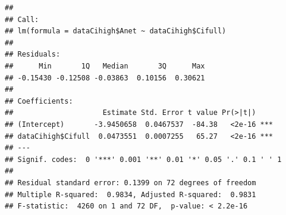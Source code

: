 \documentclass[
]{krantz}
\makeatletter
\newenvironment{Shaded}{\begin{snugshade}}{\end{snugshade}}
\newcommand{\DecValTok}[1]{\textcolor[rgb]{0.00,0.00,0.81}{#1}}
\newcommand{\FunctionTok}[1]{\textcolor[rgb]{0.00,0.00,0.00}{#1}}
\newcommand{\NormalTok}[1]{#1}
\newcommand{\OtherTok}[1]{\textcolor[rgb]{0.56,0.35,0.01}{#1}}
\newcommand{\SpecialCharTok}[1]{\textcolor[rgb]{0.00,0.00,0.00}{#1}}
\newenvironment{kframe}{%
\medskip{}
\setlength{\fboxsep}{.8em}
 \def\at@end@of@kframe{}%
 \ifinner\ifhmode%
  \def\at@end@of@kframe{\end{minipage}}%
  \begin{minipage}{\columnwidth}%
 \fi\fi%
 \def\FrameCommand##1{\hskip\@totalleftmargin \hskip-\fboxsep
 \colorbox{shadecolor}{##1}\hskip-\fboxsep
     \hskip-\linewidth \hskip-\@totalleftmargin \hskip\columnwidth}%
 \MakeFramed {\advance\hsize-\width
   \@totalleftmargin\z@ \linewidth\hsize
   \@setminipage}}%
 {\par\unskip\endMakeFramed%
 \at@end@of@kframe}
\renewenvironment{Shaded}{\begin{kframe}}{\end{kframe}}
\makeatother
\begin{document}
\begin{Shaded}
\end{Shaded}

\begin{verbatim}
## 
## Call:
## lm(formula = dataCihigh$Anet ~ dataCihigh$Cifull)
## 
## Residuals:
##      Min       1Q   Median       3Q      Max 
## -0.15430 -0.12508 -0.03863  0.10156  0.30621 
## 
## Coefficients:
##                     Estimate Std. Error t value Pr(>|t|)    
## (Intercept)       -3.9450658  0.0467537  -84.38   <2e-16 ***
## dataCihigh$Cifull  0.0473551  0.0007255   65.27   <2e-16 ***
## ---
## Signif. codes:  0 '***' 0.001 '**' 0.01 '*' 0.05 '.' 0.1 ' ' 1
## 
## Residual standard error: 0.1399 on 72 degrees of freedom
## Multiple R-squared:  0.9834, Adjusted R-squared:  0.9831 
## F-statistic:  4260 on 1 and 72 DF,  p-value: < 2.2e-16
\end{verbatim}
\end{document}
